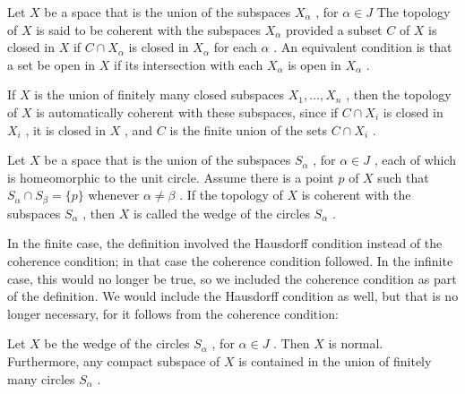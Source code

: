 \begin{definition} Let \(X\) be a space that is the union of the subspaces \({X}_{\alpha }\) , for \(\alpha  \in  J\) The topology of \(X\) is said to be coherent with the subspaces \({X}_{\alpha }\) provided a subset \(C\) of \(X\) is closed in \(X\) if \(C \cap  {X}_{\alpha }\) is closed in \({X}_{\alpha }\) for each \(\alpha\) . An equivalent condition is that a set be open in \(X\) if its intersection with each \({X}_{\alpha }\) is open in \({X}_{\alpha }\) .
\end{definition}

If \(X\) is the union of finitely many closed subspaces \({X}_{1},\ldots ,{X}_{n}\) , then the topology of \(X\) is automatically coherent with these subspaces, since if \(C \cap  {X}_{i}\) is closed in \({X}_{i}\) , it is closed in \(X\) , and \(C\) is the finite union of the sets \(C \cap  {X}_{i}\) .

\begin{definition} Let \(X\) be a space that is the union of the subspaces \({S}_{\alpha }\) , for \(\alpha  \in  J\) , each of which is homeomorphic to the unit circle. Assume there is a point \(p\) of \(X\) such that \({S}_{\alpha } \cap  {S}_{\beta } = \{ p\}\) whenever \(\alpha  \neq  \beta\) . If the topology of \(X\) is coherent with the subspaces \({S}_{\alpha }\) , then \(X\) is called the wedge of the circles \({S}_{\alpha }\) .
\end{definition}

In the finite case, the definition involved the Hausdorff condition instead of the coherence condition; in that case the coherence condition followed. In the infinite case, this would no longer be true, so we included the coherence condition as part of the definition. We would include the Hausdorff condition as well, but that is no longer necessary, for it follows from the coherence condition:

\begin{lemma} Let \(X\) be the wedge of the circles \({S}_{\alpha }\) , for \(\alpha  \in  J\) . Then \(X\) is normal. Furthermore, any compact subspace of \(X\) is contained in the union of finitely many circles \({S}_{\alpha }\) .
\end{lemma}


